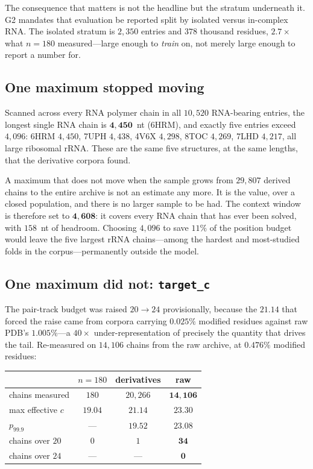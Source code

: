 \documentclass[11pt,a4paper]{article}
\begin{document}
The consequence that matters is not the headline but the stratum underneath it.
G2 mandates that evaluation be reported split by isolated versus in-complex RNA.
The isolated stratum is $2{,}350$ entries and $378$ thousand residues,
$\mathbf{2.7\times}$ what $n=180$ measured---large enough to \emph{train} on,
not merely large enough to report a number for.

\subsection{One maximum stopped moving}

Scanned across every RNA polymer chain in all $10{,}520$ RNA-bearing entries,
the longest single RNA chain is $\mathbf{4{,}450}$~nt (6HRM), and exactly five
entries exceed $4{,}096$: 6HRM $4{,}450$, 7UPH $4{,}438$, 4V6X $4{,}298$, 8TOC
$4{,}269$, 7LHD $4{,}217$, all large ribosomal rRNA. These are the same five
structures, at the same lengths, that the derivative corpora found.

A maximum that does not move when the sample grows from $29{,}807$ derived
chains to the entire archive is not an estimate any more. It is the value, over
a closed population, and there is no larger sample to be had. The context window
is therefore set to $\mathbf{4{,}608}$: it covers every RNA chain that has ever
been solved, with $158$~nt of headroom. Choosing $4{,}096$ to save $11\%$ of the
position budget would leave the five largest rRNA chains---among the hardest and
most-studied folds in the corpus---permanently outside the model.

\subsection{One maximum did not: \texttt{target\_c}}

The pair-track budget was raised $20 \rightarrow 24$ provisionally, because the
$21.14$ that forced the raise came from corpora carrying $0.025\%$ modified
residues against raw PDB's $1.005\%$---a $40\times$ under-representation of
precisely the quantity that drives the tail. Re-measured on $14{,}106$ chains
from the raw archive, at $0.476\%$ modified residues:

\begin{table}[h]
\centering
\small
\begin{tabular}{lccc}
\toprule
& \textbf{$n=180$} & \textbf{derivatives} & \textbf{raw} \\
\midrule
chains measured        & $180$   & $20{,}266$ & $\mathbf{14{,}106}$ \\
max effective $c$      & $19.04$ & $21.14$    & $\mathbf{23.30}$ \\
$p_{99.9}$             & ---     & $19.52$    & $\mathbf{23.08}$ \\
chains over $20$       & $0$     & $1$        & $\mathbf{34}$ \\
chains over $24$       & ---     & ---        & $\mathbf{0}$ \\
\bottomrule
\end{tabular}
\end{table}
\end{document}
